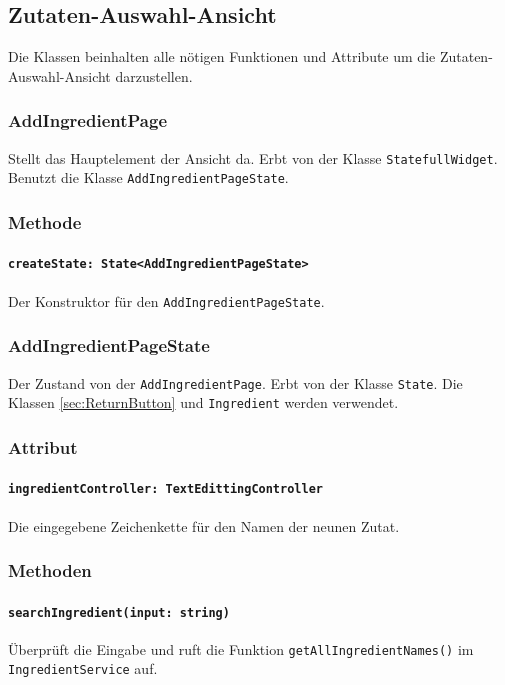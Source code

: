 \documentclass{entwurfsheft}
\begin{document}
    \newpage

\subsection{Zutaten-Auswahl-Ansicht}
        Die Klassen beinhalten alle nötigen Funktionen und Attribute um die Zutaten-Auswahl-Ansicht darzustellen.
    
        \subsubsection{AddIngredientPage}
            Stellt das Hauptelement der Ansicht da. Erbt von der Klasse \texttt{StatefullWidget}. Benutzt die Klasse \texttt{AddIngredientPageState}.
            \subsubsection*{Methode}
                \paragraph*{\texttt{createState: State<AddIngredientPageState>}} Der Konstruktor für den \texttt{AddIngredientPageState}.
        
        \subsubsection{AddIngredientPageState}
            Der Zustand von der \texttt{AddIngredientPage}. Erbt von der Klasse \texttt{State}. Die Klassen \ref{sec:ReturnButton} und \texttt{Ingredient} werden verwendet.
            \subsubsection*{Attribut}
                \paragraph*{\texttt{ingredientController: TextEdittingController}} Die eingegebene Zeichenkette für den Namen der neunen Zutat.
    
            \subsubsection*{Methoden}
                \paragraph*{\texttt{searchIngredient(input: string)}} Überprüft die Eingabe und ruft die Funktion \texttt{getAllIngredientNames()} im \texttt{IngredientService} auf.
\end{document}
